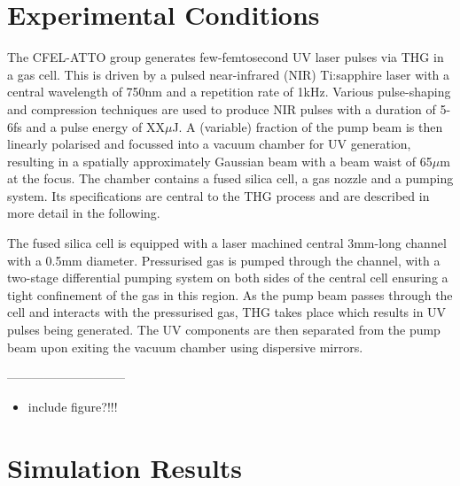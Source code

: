 \documentclass[a4paper]{jpconf}
\begin{document}
\section{Experimental Conditions}
The CFEL-ATTO group generates few-femtosecond UV laser pulses via THG in a gas cell. This is driven by a pulsed near-infrared (NIR) Ti:sapphire laser with a central wavelength of 750nm and a repetition rate of 1kHz. Various pulse-shaping and compression techniques are used to produce NIR pulses with a duration of 5-6fs and a pulse energy of XX$\mu$J. A (variable) fraction of the pump beam is then linearly polarised and focussed into a vacuum chamber for UV generation, resulting in a spatially approximately Gaussian beam with a beam waist of 65$\mu$m at the focus. The chamber contains a fused silica cell, a gas nozzle and a pumping system. Its specifications are central to the THG process and are described in more detail in the following. \par 
The fused silica cell is equipped with a laser machined central 3mm-long channel with a 0.5mm diameter. Pressurised gas is pumped through the channel, with a two-stage differential pumping system on both sides of the central cell ensuring a tight confinement of the gas in this region. As the pump beam passes through the cell and interacts with the pressurised gas, THG takes place which results in UV pulses being generated. The UV components are then separated from the pump beam upon exiting the vacuum chamber using dispersive mirrors. 

-----------------------------
\begin{itemize}
\item include figure?!!!
\end{itemize}



\section{Simulation Results}
\end{document}

